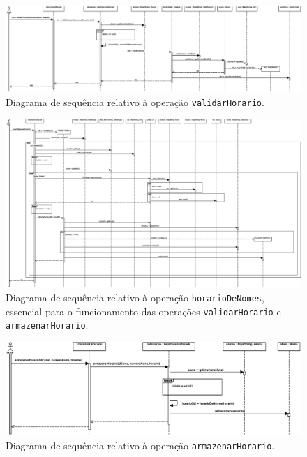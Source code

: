 \documentclass[12pt, a4paper]{article}
\begin{document}
\begin{landscape}
        \begin{figure}[H]
            \centering
            \includegraphics[scale=0.55]{Imagens/Modelos/validarHorario.svg.eps}
            \caption{
                Diagrama de sequência relativo à operação \texttt{validarHorario}.
            }
        \end{figure}

        \vspace*{\fill}
        \pagebreak
        \vspace*{\fill}

        \begin{figure}[H]
            \centering
            \includegraphics[scale=0.45]{Imagens/Modelos/horarioDeNomes.svg.eps}
            \caption{
                Diagrama de sequência relativo à operação \texttt{horarioDeNomes}, essencial para o
                funcionamento das operações \texttt{validarHorario} e \texttt{armazenarHorario}.
            }
        \end{figure}

        \vspace*{\fill}
        \pagebreak
        \vspace*{\fill}

        \begin{figure}[H]
            \centering
            \includegraphics[scale=0.85]{Imagens/Modelos/armazenarHorario.svg.eps}
            \caption{
                Diagrama de sequência relativo à operação \texttt{armazenarHorario}.
            }
        \end{figure}

        \vspace*{\fill}
    \end{landscape}
\end{document}
